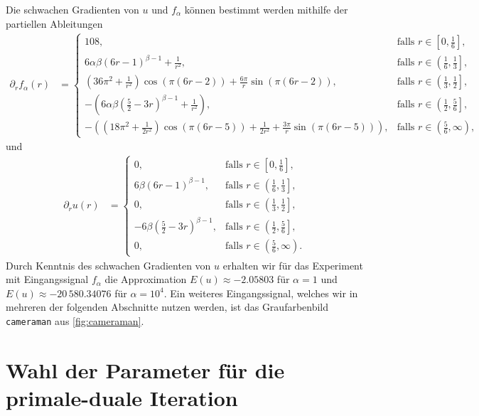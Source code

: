 Die schwachen Gradienten von $u$ und $f_\alpha$ können bestimmt werden mithilfe
der partiellen Ableitungen
\begin{align*}
  \partial_r f_\alpha(r)
  &=
  \begin{cases}
    108,
    & \text{falls } r\in\left[0,\frac{1}{6}\right]\!,\\
    6\alpha\beta(6r-1)^{\beta-1} +\frac{1}{r^2}, 
    & \text{falls } r\in\left(\frac{1}{6},\frac{1}{3}\right]\!,\\
    \left(36\pi^2+\frac{1}{r^2}\right)\cos(\pi(6r-2))
    + \frac{6\pi}{r}\sin(\pi(6r-2)), 
    & \text{falls } r\in\left(\frac{1}{3},\frac{1}{2}\right]\!,\\
    -\left(6\alpha\beta\left( \frac{5}{2}-3r \right)^{\beta-1}+
    \frac{1}{r^2}\right),
    & \text{falls } r\in\left(\frac{1}{2},\frac{5}{6}\right]\!,\\
    -\left( \left( 18\pi^2+\frac{1}{2r^2} \right)\cos(\pi(6r-5))
    +\frac{1}{2r^2} + \frac{3\pi}{r}\sin(\pi(6r-5))\right)\!, 
    &\text{falls } r\in\left(\frac{5}{6},\infty\right)\!,
  \end{cases}
\end{align*}
und 
\begin{align*}
  \partial_r u(r) 
  &= 
  \begin{cases}
    0,
    & \text{falls } r\in\left[0,\frac{1}{6}\right]\!,\\
    6\beta(6r-1)^{\beta-1}, 
    & \text{falls } r\in\left(\frac{1}{6},\frac{1}{3}\right]\!,\\
    0, 
    & \text{falls } r\in\left(\frac{1}{3},\frac{1}{2}\right]\!,\\
    -6\beta\left( \frac{5}{2}-3r \right)^{\beta-1},
    & \text{falls } r\in\left(\frac{1}{2},\frac{5}{6}\right]\!,\\
    0,
    &\text{falls } r\in\left(\frac{5}{6},\infty\right)\!.
  \end{cases}
\end{align*} 
Durch Kenntnis des schwachen Gradienten von $u$ erhalten wir für das Experiment
mit Eingangssignal $f_\alpha$ die Approximation $E(u)\approx -2.05803$ für
$\alpha=1$ und $E(u)\approx -20\,580.34076$ für $\alpha=10^4$.
Ein weiteres Eingangssignal, welches wir in mehreren der folgenden Abschnitte
nutzen werden, ist das Graufarbenbild \texttt{cameraman} aus
\cref{fig:cameraman}.

\section{Wahl der Parameter für die primale-duale Iteration}
\label{sec:choiceOfParameters}

